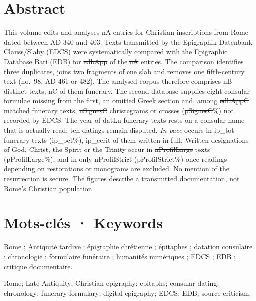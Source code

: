 \section*{Abstract}
This volume edits and analyses \st{nA} entries for Christian inscriptions from Rome dated between AD 340 and 403. Texts transmitted by the Epigraphik-Datenbank Clauss/Slaby (EDCS) were systematically compared with the Epigraphic Database Bari (EDB) for \st{edbApp} of the \st{nA} entries. The comparison identifies three duplicates, joins two fragments of one slab and removes one fifth-century text (no.~98, AD 461 or 482). The analysed corpus therefore comprises \st{nB} distinct texts, \st{nC} of them funerary. The second database supplies eight consular formulae missing from the first, an omitted Greek section and, among \st{edbAppC} matched funerary texts, \st{nSignesC} christograms or crosses (\st{pSignesC}\%) not recorded by EDCS. The year of \st{datLu} funerary texts rests on a consular name that is actually read; ten datings remain disputed. \emph{In pace} occurs in \st{ip_tot} funerary texts (\st{ip_pct}\%), \st{ip_ecrit} of them written in full. Written designations of God, Christ, the Spirit or the Trinity occur in \st{nProfilLarge} texts (\st{pProfilLarge}\%), and in only \st{nProfilStrict} (\st{pProfilStrict}\%) once readings depending on restorations or monograms are excluded. No mention of the resurrection is secure. The figures describe a transmitted documentation, not Rome’s Christian population.

\section*{Mots-clés · Keywords}
Rome ; Antiquité tardive ; épigraphie chrétienne ; épitaphes ; datation consulaire ; chronologie ; formulaire funéraire ; humanités numériques ; EDCS ; EDB ; critique documentaire.

\noindent Rome; Late Antiquity; Christian epigraphy; epitaphs; consular dating; chronology; funerary formulary; digital epigraphy; EDCS; EDB; source criticism.

